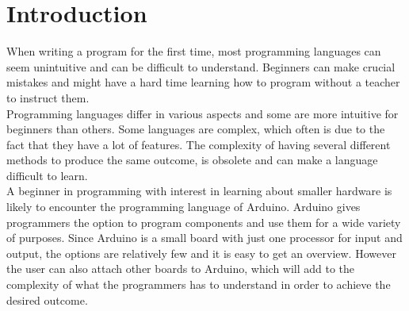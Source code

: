 \section{Introduction}
When writing a program for the first time, most programming languages can seem unintuitive and can be difficult to understand. Beginners can make crucial mistakes and might have a hard time learning how to program without a teacher to instruct them.\\

Programming languages differ in various aspects and some are more intuitive for beginners than others. Some languages are complex, which often is due to the fact that they have a lot of features. The complexity of having several different methods to produce the same outcome, is obsolete and can make a language difficult to learn. \\

A beginner in programming with interest in learning about smaller hardware is likely to encounter the programming language of Arduino. Arduino gives programmers the option to program components and use them for a wide variety of purposes. Since Arduino is a small board with just one processor for input and output, the options are relatively few and it is easy to get an overview. However the user can also attach other boards to Arduino, which will add to the complexity of what the programmers has to understand in order to achieve the desired outcome. \\